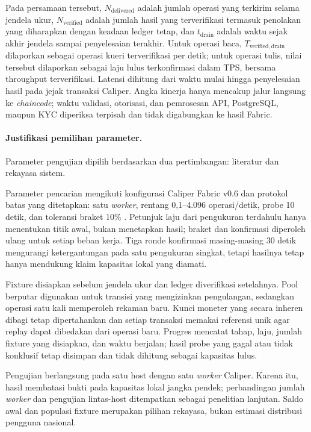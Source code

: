 Pada persamaan tersebut, $N_{\mathrm{delivered}}$ adalah jumlah operasi yang
terkirim selama jendela ukur, $N_{\mathrm{verified}}$ adalah jumlah hasil yang
terverifikasi termasuk penolakan yang diharapkan dengan keadaan ledger tetap,
dan $t_{\mathrm{drain}}$ adalah waktu sejak akhir jendela sampai penyelesaian
terakhir. Untuk operasi baca, $T_{\mathrm{verified,drain}}$ dilaporkan sebagai
operasi kueri terverifikasi per detik; untuk operasi tulis, nilai tersebut
dilaporkan sebagai laju lulus terkonfirmasi dalam TPS, bersama throughput terverifikasi. Latensi dihitung dari waktu mulai hingga
penyelesaian hasil pada jejak transaksi Caliper. Angka kinerja hanya mencakup
jalur langsung ke \textit{chaincode}; waktu validasi, otorisasi, dan pemrosesan
API, PostgreSQL, maupun KYC diperiksa terpisah dan tidak digabungkan ke hasil
Fabric.

\paragraph{Justifikasi pemilihan parameter.}
Parameter pengujian dipilih berdasarkan dua pertimbangan: literatur dan
rekayasa sistem.

Parameter pencarian mengikuti konfigurasi Caliper Fabric v0.6 dan protokol
batas yang ditetapkan: satu \textit{worker}, rentang 0,1--4.096 operasi/detik,
probe 10 detik, dan toleransi braket 10\% \cite{hlf_caliper}. Petunjuk laju
dari pengukuran terdahulu hanya menentukan titik awal, bukan menetapkan hasil;
braket dan konfirmasi diperoleh ulang untuk setiap beban kerja. Tiga ronde
konfirmasi masing-masing 30 detik mengurangi ketergantungan pada satu
pengukuran singkat, tetapi hasilnya tetap hanya mendukung klaim kapasitas lokal
yang diamati.

Fixture disiapkan sebelum jendela ukur dan ledger diverifikasi setelahnya.
Pool berputar digunakan untuk transisi yang mengizinkan pengulangan, sedangkan
operasi satu kali memperoleh rekaman baru. Kunci moneter yang secara inheren
dibagi tetap dipertahankan dan setiap transaksi memakai referensi unik agar
replay dapat dibedakan dari operasi baru. Progres mencatat tahap, laju, jumlah
fixture yang disiapkan, dan waktu berjalan; hasil probe yang gagal atau tidak
konklusif tetap disimpan dan tidak dihitung sebagai kapasitas lulus.

Pengujian berlangsung pada satu host dengan satu \textit{worker} Caliper.
Karena itu, hasil membatasi bukti pada kapasitas lokal jangka pendek;
perbandingan jumlah \textit{worker} dan pengujian lintas-host ditempatkan
sebagai penelitian lanjutan. Saldo awal dan populasi fixture merupakan pilihan
rekayasa, bukan estimasi distribusi pengguna nasional.

